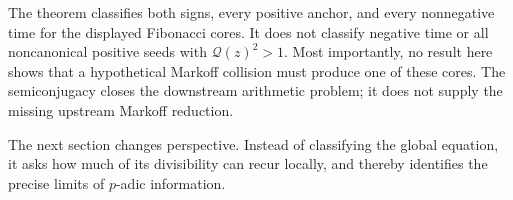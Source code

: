 \begin{remark}
The theorem classifies both signs, every positive anchor, and every
nonnegative time for the displayed Fibonacci cores. It does not classify
negative time or all noncanonical positive seeds with
$\mathcal Q(z)^2>1$. Most importantly, no result here shows that a
hypothetical Markoff collision must produce one of these cores. The
semiconjugacy closes the downstream arithmetic problem; it does not supply
the missing upstream Markoff reduction.
\end{remark}

The next section changes perspective. Instead of classifying the global
equation, it asks how much of its divisibility can recur locally, and thereby
identifies the precise limits of $p$-adic information.
